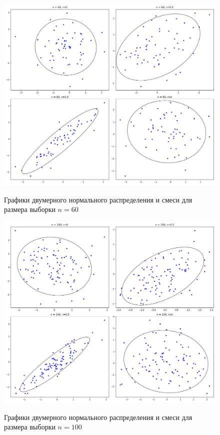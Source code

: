 \documentclass[a4]{article}
\begin{document}
\vspace{-10cm}
\begin{figure}[H]
    \centering
    \caption{Графики двумерного нормального распределения и смеси для размера выборки $ n =60 $ }
    \includegraphics[scale = 0.5]{ellipse_n=60.png}
    \label{fig:dis_norm_gis1}
\end{figure}

\vspace{-1cm}
\begin{figure}[H]
    \centering
    \caption{Графики двумерного нормального распределения и смеси для размера выборки $ n =100 $ }
    \includegraphics[scale = 0.5]{ellipse_n=100.png} 
    \label{fig:dis_norm_gis2}
\end{figure}
\end{document}
